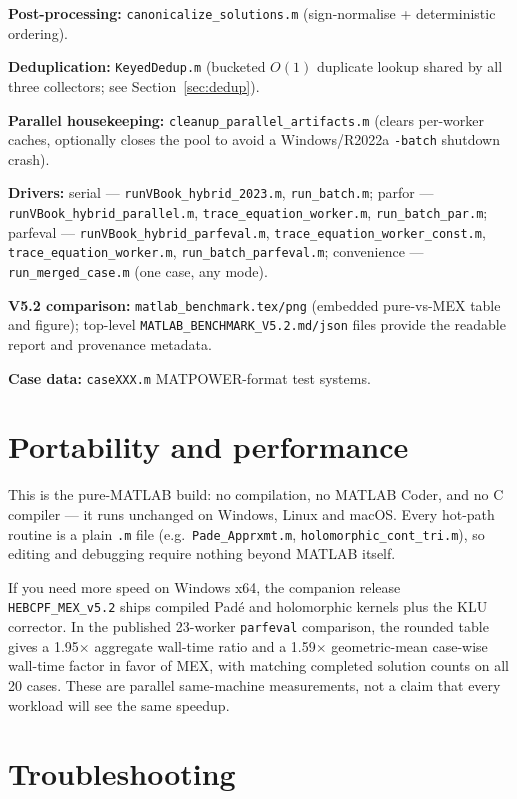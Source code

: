 \documentclass[11pt,a4paper]{article}
\newcommand{\code}[1]{\texttt{#1}}
\begin{document}
\textbf{Post-processing:} \code{canonicalize_solutions.m} (sign-normalise + deterministic
ordering).

\textbf{Deduplication:} \code{KeyedDedup.m} (bucketed $O(1)$ duplicate lookup shared by all
three collectors; see Section~\ref{sec:dedup}).

\textbf{Parallel housekeeping:} \code{cleanup_parallel_artifacts.m} (clears per-worker
caches, optionally closes the pool to avoid a Windows/R2022a \code{-batch} shutdown
crash).

\textbf{Drivers:}
serial --- \code{runVBook_hybrid_2023.m}, \code{run_batch.m};
parfor --- \code{runVBook_hybrid_parallel.m}, \code{trace_equation_worker.m},
\code{run_batch_par.m};
parfeval --- \code{runVBook_hybrid_parfeval.m}, \code{trace_equation_worker_const.m},
\code{trace_equation_worker.m}, \code{run_batch_parfeval.m};
convenience --- \code{run_merged_case.m} (one case, any mode).

\textbf{V5.2 comparison:} \code{matlab_benchmark.tex/png} (embedded pure-vs-MEX table
and figure); top-level \code{MATLAB_BENCHMARK_V5.2.md/json} files provide the readable
report and provenance metadata.

\textbf{Case data:} \code{caseXXX.m} MATPOWER-format test systems.

\section{Portability and performance}

This is the pure-MATLAB build: no compilation, no MATLAB Coder, and no C compiler --- it
runs unchanged on Windows, Linux and macOS. Every hot-path routine is a plain \code{.m}
file (e.g.\ \code{Pade_Apprxmt.m}, \code{holomorphic_cont_tri.m}), so editing and
debugging require nothing beyond MATLAB itself.

If you need more speed on Windows x64, the companion release \code{HEBCPF_MEX_v5.2}
ships compiled Pad\'e and holomorphic kernels plus the KLU corrector. In the published
23-worker \code{parfeval} comparison, the rounded table gives a 1.95$\times$ aggregate
wall-time ratio and a 1.59$\times$ geometric-mean case-wise wall-time factor in favor of
MEX, with matching completed solution counts on all 20 cases. These are parallel
same-machine measurements, not a claim that every workload will see the same speedup.

\section{Troubleshooting}
\end{document}
